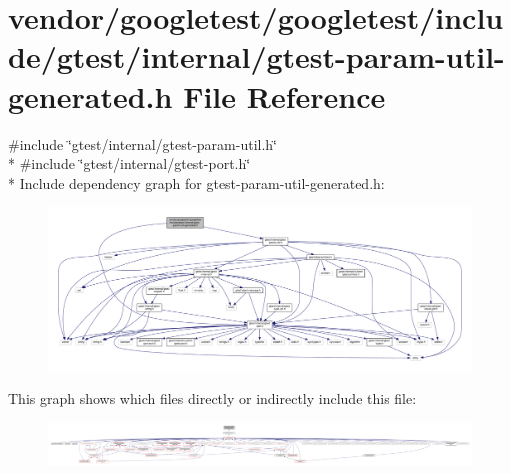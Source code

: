 \hypertarget{gtest-param-util-generated_8h}{}\section{vendor/googletest/googletest/include/gtest/internal/gtest-\/param-\/util-\/generated.h File Reference}
\label{gtest-param-util-generated_8h}
{\ttfamily \#include \char`\"{}gtest/internal/gtest-\/param-\/util.\+h\char`\"{}}\\*
{\ttfamily \#include \char`\"{}gtest/internal/gtest-\/port.\+h\char`\"{}}\\*
Include dependency graph for gtest-\/param-\/util-\/generated.h\+:\nopagebreak
\begin{figure}[H]
\begin{center}
\leavevmode
\includegraphics[width=350pt]{gtest-param-util-generated_8h__incl}
\end{center}
\end{figure}
This graph shows which files directly or indirectly include this file\+:\nopagebreak
\begin{figure}[H]
\begin{center}
\leavevmode
\includegraphics[width=350pt]{gtest-param-util-generated_8h__dep__incl}
\end{center}
\end{figure}
